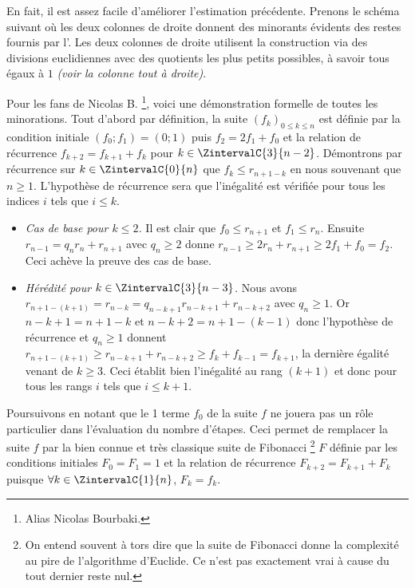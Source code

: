 En fait, il est assez facile d'améliorer l'estimation précédente. Prenons le schéma suivant où les deux colonnes de droite donnent des minorants évidents des restes fournis par l'\algoeucl. Les deux colonnes de droite utilisent la construction via des divisions euclidiennes  avec des quotients les plus petits possibles, à savoir tous égaux à $1$ \emph{(voir la colonne tout à droite)}. 



\medskip


Pour les fans de Nicolas B.
\footnote{
	Alias Nicolas Bourbaki.
},
voici une démonstration formelle de toutes les minorations. Tout d'abord par définition, la suite $(f_k)_{0 \leq k \leq n}$ est définie par la condition initiale $(f_0 ; f_1) = (0 ; 1)$ puis $f_2 = 2 f_1 + f_0$ et la relation de récurrence $f_{k+2} = f_{k+1} + f_k$ pour $k \in \ZintervalC{3}{n-2}$. Démontrons par récurrence sur $k \in \ZintervalC{0}{n}$ que $f_k \leq r_{n+1-k}$ en nous souvenant que $n \geq 1$. L'hypothèse de récurrence sera que l'inégalité est vérifiée pour tous les indices $i$ tels que $i \leq k$.

\begin{itemize}[label=\small\textbullet]
	\item \emph{Cas de base pour $k \leq 2$.}
		  Il est clair que $f_0 \leq r_{n+1}$ et  $f_1 \leq r_{n}$.
		  Ensuite $r_{n-1} = q_n r_n + r_{n+1}$ avec $q_n \geq 2$ donne $r_{n-1} \geq 2 r_n + r_{n+1} \geq 2 f_1 + f_0 = f_2$. Ceci achève la preuve des cas de base.
	
	
	\item \emph{Hérédité pour $k \in \ZintervalC{3}{n-3}$.} 
		  Nous avons $r_{n+1 - (k+1)} = r_{n-k} = q_{n-k+1} r_{n-k+1} + r_{n-k+2}$ avec $q_n \geq 1$.
		  Or $n-k+1 = n+1 - k$ et $n-k+2 = n+1 - (k-1)$ donc l'hypothèse de récurrence et $q_n \geq 1$ donnent $r_{n+1 - (k+1)} \geq r_{n-k+1} + r_{n-k+2} \geq f_k + f_{k-1} = f_{k+1}$, la dernière égalité venant de $k \geq 3$.
		  Ceci établit bien l'inégalité au rang $(k+1)$ et donc pour tous les rangs $i$ tels que $i \leq k+1$.
\end{itemize}


\medskip


Poursuivons en notant que le 1\ier{} terme $f_0$ de la suite $f$ ne jouera pas un rôle particulier dans l'évaluation du nombre d'étapes.
Ceci permet de remplacer la suite $f$ par la bien connue et très classique suite de Fibonacci
\footnote{
	On entend souvent à tors dire que la suite de Fibonacci donne la complexité au pire de l'algorithme d'Euclide. Ce n'est pas exactement vrai à cause du tout dernier reste nul.
}
$F$ définie par les conditions initiales $F_0 = F_1 = 1$ et la relation de récurrence $F_{k+2} = F_{k+1} + F_k$ puisque $\forall k \in \ZintervalC{1}{n}$, $F_k = f_k$.


